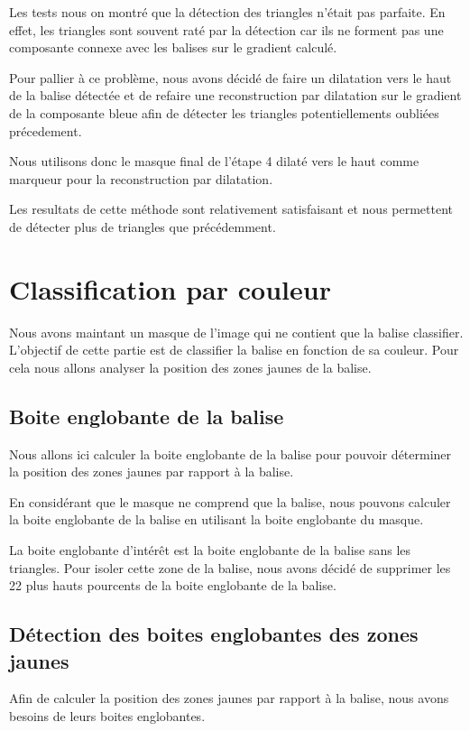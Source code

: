 \documentclass{article}
\begin{document}
Les tests nous on montré que la détection des triangles n'était pas parfaite.
En effet, les triangles sont souvent raté par la détection car ils ne forment
pas une composante connexe avec les balises sur le gradient calculé.

Pour pallier à ce problème, nous avons décidé de faire un dilatation vers le
haut de la balise détectée et de refaire une reconstruction par dilatation sur
le gradient de la composante bleue afin de détecter les triangles
potentiellements oubliées précedement.

Nous utilisons donc le masque final de l'étape 4 dilaté vers le haut comme
marqueur pour la reconstruction par dilatation.

Les resultats de cette méthode sont relativement satisfaisant et nous
permettent de détecter plus de triangles que précédemment.

\section{Classification par couleur}

Nous avons maintant un masque de l'image qui ne contient que la balise
classifier. L'objectif de cette partie est de classifier la balise en fonction
de sa couleur. Pour cela nous allons analyser la position des zones jaunes de
la balise.

\subsection{Boite englobante de la balise}

Nous allons ici calculer la boite englobante de la balise pour pouvoir
déterminer la position des zones jaunes par rapport à la balise.

En considérant que le masque ne comprend que la balise, nous pouvons calculer
la boite englobante de la balise en utilisant la boite englobante du masque.

La boite englobante d'intérêt est la boite englobante de la balise sans les
triangles. Pour isoler cette zone de la balise, nous avons décidé de supprimer
les 22 plus hauts pourcents de la boite englobante de la balise.

\subsection{Détection des boites englobantes des zones jaunes}

Afin de calculer la position des zones jaunes par rapport à la balise, nous
avons besoins de leurs boites englobantes.
\end{document}
